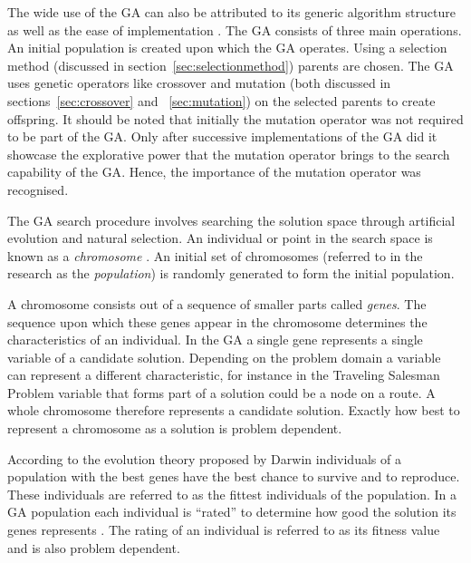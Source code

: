 The wide use of the \gls{GA} can also be attributed to its generic algorithm structure as well as the ease of implementation \cite{FamilyGA,AdaptiveSAGA}. The \gls{GA} consists of three main operations. An initial population is created upon which the GA operates. Using a selection method (discussed in section~\ref{sec:selectionmethod}) parents are chosen. The \gls{GA} uses genetic operators like crossover and mutation (both discussed in sections~\ref{sec:crossover} and ~\ref{sec:mutation}) on the selected parents to create offspring\cite{GAGoldberg}. It should be noted that initially the mutation operator was not required to be part of the \gls{GA}. Only after successive implementations of the \gls{GA} did it showcase the explorative power that the mutation operator brings to the search capability of the \gls{GA}. Hence, the importance of the mutation operator was recognised\cite{CompuIntelligenceIntro}. 


The \gls{GA} search procedure involves searching the solution space through artificial evolution and natural selection\cite{FamilyGA,MultiPopGA,HybridIntelliGA}. An individual or point in the search space is known as a \emph{chromosome} \cite{HumanPassiveGA}. An initial set of chromosomes (referred to in the research as the \emph{population}) is randomly generated to form the initial population\cite{FamilyGA,HybridIntelliGA,AcceleratingGA,MultiPopGA}. 

A chromosome consists out of a sequence of smaller parts called \emph{genes}\cite{CompuIntelligenceIntro}. The sequence upon which these genes appear in the chromosome determines the characteristics of an individual\cite{CompuIntelligenceIntro}. In the \gls{GA} a single gene represents a single variable of a candidate solution. Depending on the problem domain a variable can represent a different characteristic, for instance in the Traveling Salesman Problem  variable that forms part of a solution could be a node on a route\cite{FamilyGA,AcceleratingGA}. A whole chromosome therefore represents a candidate solution\cite{FamilyGA,AcceleratingGA}. Exactly how best to represent a chromosome as a solution is problem dependent\cite{CompuIntelligenceIntro}.

According to the evolution theory proposed by Darwin individuals of a population with the best genes have the best chance to survive and to reproduce\cite{CompuIntelligenceIntro}. These individuals are referred to as the fittest individuals of the population. In a \gls{GA} population each individual is ``rated'' to determine how good the solution its genes represents \cite{CompuIntelligenceIntro}. The rating of an individual is referred to as its fitness value and is also problem dependent\cite{CompuIntelligenceIntro}.

